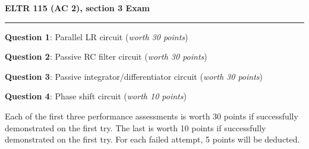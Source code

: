 
\centerline{\bf ELTR 115 (AC 2), section 3 Exam} \bigskip 
 
\vskip 10pt

\noindent
{}

\vskip 5pt

\hrule

\vskip 20pt

\noindent
{\bf Question 1}: Parallel LR circuit ({\it worth 30 points})

\vskip 10pt

\noindent
{\bf Question 2}: Passive RC filter circuit ({\it worth 30 points})

\vskip 10pt

\noindent
{\bf Question 3}: Passive integrator/differentiator circuit ({\it worth 30 points})

\vskip 10pt

\noindent
{\bf Question 4}: Phase shift circuit ({\it worth 10 points})

\vskip 20pt

Each of the first three performance assessments is worth 30 points if successfully demonstrated on the first try.  The last is worth 10 points if successfully demonstrated on the first try.  For each failed attempt, 5 points will be deducted.

\vfil \eject



